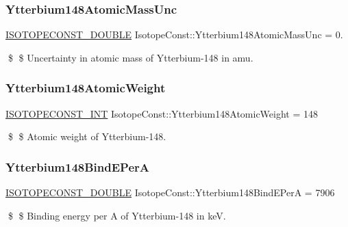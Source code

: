 \subsubsection{\texorpdfstring{Ytterbium148\+Atomic\+Mass\+Unc}{Ytterbium148AtomicMassUnc}}
{\footnotesize\ttfamily \mbox{\hyperlink{group___isotope_const-_macros_ga8f45a7272ce02c0b4c65c44636ed719a}{I\+S\+O\+T\+O\+P\+E\+C\+O\+N\+S\+T\+\_\+\+D\+O\+U\+B\+LE}} Isotope\+Const\+::\+Ytterbium148\+Atomic\+Mass\+Unc = 0.}

\$ \$ Uncertainty in atomic mass of Ytterbium-\/148 in amu. \mbox{\label{group___isotope_const-_ytterbium-_yb148_gaf73f1dd532db76713d8ce2d516edff0d}} 
\subsubsection{\texorpdfstring{Ytterbium148\+Atomic\+Weight}{Ytterbium148AtomicWeight}}
{\footnotesize\ttfamily \mbox{\hyperlink{group___isotope_const-_macros_ga5f18360b3e99483a35c32d789e62621c}{I\+S\+O\+T\+O\+P\+E\+C\+O\+N\+S\+T\+\_\+\+I\+NT}} Isotope\+Const\+::\+Ytterbium148\+Atomic\+Weight = 148}

\$ \$ Atomic weight of Ytterbium-\/148. \mbox{\label{group___isotope_const-_ytterbium-_yb148_ga32e90806b21b56ef5c0c6237657fc9af}} 
\subsubsection{\texorpdfstring{Ytterbium148\+Bind\+E\+PerA}{Ytterbium148BindEPerA}}
{\footnotesize\ttfamily \mbox{\hyperlink{group___isotope_const-_macros_ga8f45a7272ce02c0b4c65c44636ed719a}{I\+S\+O\+T\+O\+P\+E\+C\+O\+N\+S\+T\+\_\+\+D\+O\+U\+B\+LE}} Isotope\+Const\+::\+Ytterbium148\+Bind\+E\+PerA = 7906}

\$ \$ Binding energy per A of Ytterbium-\/148 in keV. \mbox{\label{group___isotope_const-_ytterbium-_yb148_ga84d6c0f1f6c9d4eb5204024768b744cd}} 
